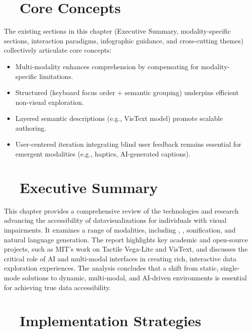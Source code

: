 \section{~~Core Concepts}\label{ch13:sec:core-concepts}
The existing sections in this chapter (Executive Summary, modality-specific sections, interaction paradigms, infographic guidance, and cross-cutting themes) collectively articulate core concepts:
\begin{itemize}
	\item Multi-modality enhances comprehension by compensating for modality-specific limitations.
	\item Structured  (keyboard focus order + semantic grouping) underpins efficient non-visual exploration\supercite{AutoVizuA11y}.
	\item Layered semantic descriptions (e.g., VisText model) promote scalable authoring\supercite{VisText, Lundgard2022Accessible}.
	\item User-centered iteration integrating blind user feedback remains essential for emergent modalities (e.g., haptics, AI-generated captions).
\end{itemize}

\section{~~Executive Summary}\label{ch13:sec:executive-summary}
This chapter provides a comprehensive review of the technologies and research advancing the accessibility of \gls{datavisualization}s for individuals with visual impairments. It examines a range of modalities, including , , sonification, and natural language generation. The report highlights key academic and open-source projects, such as MIT's work on Tactile Vega-Lite and VisText, and discusses the critical role of AI and multi-modal interfaces in creating rich, interactive data exploration experiences. The analysis concludes that a shift from static, single-mode solutions to dynamic, multi-modal, and AI-driven environments is essential for achieving true data accessibility.

\section{~~Implementation Strategies}\label{ch13:sec:implementation-strategies}
